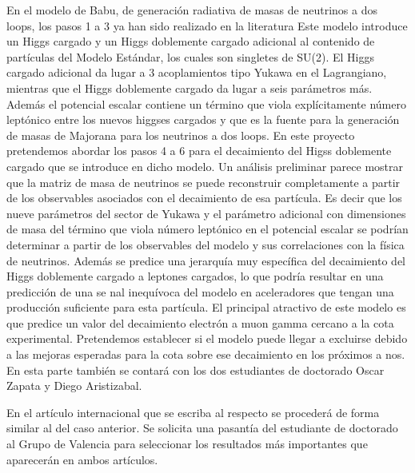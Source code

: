 \begin{ideas}
En el modelo de Babu, de generación radiativa de masas de neutrinos a
dos loops, los pasos 1 a 3 ya han sido realizado en la literatura
Este modelo introduce un Higgs cargado y un Higgs
doblemente cargado adicional al contenido de partículas del
Modelo Estándar, los cuales son singletes de SU(2). El Higgs cargado
adicional da lugar a 3 acoplamientos tipo Yukawa en el Lagrangiano,
mientras que el Higgs doblemente cargado da lugar a seis parámetros
más.  Además el potencial escalar contiene un término que viola
explícitamente número leptónico entre los nuevos higgses cargados
y que es la fuente para la generación de masas de Majorana para los
neutrinos a dos loops.  En este proyecto pretendemos abordar los pasos
4 a 6 para el decaimiento del Higss doblemente cargado que se
introduce en dicho modelo. Un análisis preliminar parece mostrar que
la matriz de masa de neutrinos se puede reconstruir completamente a
partir de los observables asociados con el decaimiento de esa
partícula. Es decir que los nueve parámetros del sector de Yukawa
y el parámetro adicional con dimensiones de masa del término que viola
número leptónico en el potencial escalar se podrían determinar a
partir de los observables del modelo y sus correlaciones con la
física de neutrinos. Además se predice una jerarquía muy
específica del decaimiento del Higgs doblemente cargado a
leptones cargados, lo que podría resultar en una predicción de
una se nal inequívoca del modelo en aceleradores que tengan una
producción suficiente para esta partícula. El principal atractivo
de este modelo es que predice un valor del decaimiento electrón a muon
gamma cercano a la cota experimental. Pretendemos establecer si el
modelo puede llegar a excluirse debido a las mejoras esperadas para la
cota sobre ese decaimiento en los próximos a nos. En esta parte también
se contará con los dos estudiantes de doctorado Oscar Zapata y Diego
Aristizabal.

En el artículo internacional que se escriba al respecto se procederá
de forma similar al del caso anterior. Se solicita una pasantía del
estudiante de doctorado al Grupo de Valencia para seleccionar los
resultados más importantes que aparecerán en ambos artículos.



\end{ideas}
